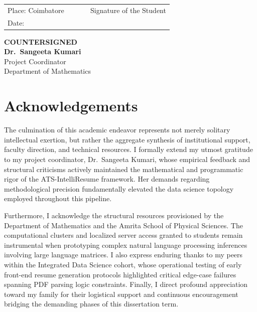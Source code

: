 \documentclass[12pt,a4paper]{report}
\begin{document}
\vspace{2cm}
\noindent
\begin{tabular}{@{}p{0.5\linewidth} p{0.5\linewidth}@{}}
Place: Coimbatore & \hfill Signature of the Student \\[0.8cm]
Date: \phantom{Coimbatore} & \\
\end{tabular}

\vspace{4cm}
\begin{center}
\textbf{COUNTERSIGNED}\\[0.8cm]
\textbf{Dr.\ Sangeeta Kumari}\\
Project Coordinator\\
Department of Mathematics
\end{center}

\chapter*{Acknowledgements}
The culmination of this academic endeavor represents not merely solitary intellectual exertion, but rather the aggregate synthesis of institutional support, faculty direction, and technical resources. I formally extend my utmost gratitude to my project coordinator, Dr.~Sangeeta Kumari, whose empirical feedback and structural criticisms actively maintained the mathematical and programmatic rigor of the ATS-IntelliResume framework. Her demands regarding methodological precision fundamentally elevated the data science topology employed throughout this pipeline.

Furthermore, I acknowledge the structural resources provisioned by the Department of Mathematics and the Amrita School of Physical Sciences. The computational clusters and localized server access granted to students remain instrumental when prototyping complex natural language processing inferences involving large language matrices. I also express enduring thanks to my peers within the Integrated Data Science cohort, whose operational testing of early front-end resume generation protocols highlighted critical edge-case failures spanning PDF parsing logic constraints. Finally, I direct profound appreciation toward my family for their logistical support and continuous encouragement bridging the demanding phases of this dissertation term.

\end{document}
